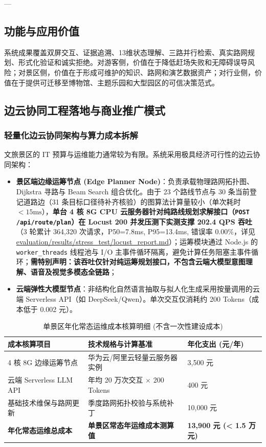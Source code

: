\documentclass[11pt,a4paper]{ctexart}
\begin{document}
---

\subsection{功能与应用价值}
系统成果覆盖双屏交互、证据追溯、13维状态理解、三路并行检索、真实路网规划、形式化验证和诚实拒绝。对游客侧，价值在于降低赶场失败和无障碍误导风险；对景区侧，价值在于形成可维护的知识、路网和演艺数据资产；对行业侧，价值在于提供可迁移至博物馆、主题乐园和大型园区的可信决策范式。

\subsection{边云协同工程落地与商业推广模式}

\subsubsection{轻量化边云协同架构与算力成本拆解}
文旅景区的 IT 预算与运维能力通常较为有限。系统采用极具经济可行性的边云协同架构：
\begin{itemize}
    \item \textbf{景区端边缘运筹节点 (Edge Planner Node)}：负责承载物理路网拓扑图、Dijkstra 寻路与 Beam Search 组合优化。由于 23 个路线节点与 30 条当前登记道路边（31 条目标口径待补齐核验）的图算法计算量较小（单次耗时 $<15\text{ms}$），\textbf{单台 4 核 8G CPU 云服务器针对纯路线规划求解接口（\texttt{POST /api/route/plan}）在 Locust 200 并发压测下实测支撑 202.4 QPS 吞吐}（3 轮累计 364,320 次请求，P50=7.8ms, P95=13.4ms, 错误率 0.00\%，详见 \url{evaluation/results/stress_test/locust_report.md}）；运筹模块通过 Node.js 的 \texttt{worker\_threads} 线程池与 I/O 主事件循环隔离，避免计算任务阻塞主事件循环；\textbf{需特别声明：该吞吐仅针对纯运筹规划接口，不包含云端大模型意图理解、语音及视觉多模态全链路}；
    \item \textbf{云端弹性大模型节点}：非结构化自然语言抽取与拟人化生成采用按量调用的云端 Serverless API（如 DeepSeek/Qwen）。单次交互仅消耗约 200 Tokens（成本低于 0.002 元）。
\end{itemize}

\begin{table}[htbp]
\centering
\small
\caption{单景区年化常态运维成本核算明细 (不含一次性建设成本)}
\label{tab:cost}
\begin{tabularx}{\textwidth}{p{4.5cm}Xp{3.5cm}}
\toprule
\textbf{成本核算项目} & \textbf{技术规格与计算基准} & \textbf{年化支出 (元/年)} \\
\midrule
4 核 8G 边缘运筹节点 & 华为云/阿里云轻量云服务器实例 & 3,500 元 \\
云端 Serverless LLM API & 年均 20 万次交互 $\times$ 200 Tokens & 400 元 \\
基础技术维保与路网更新 & 季度路网拓扑校验与系统补丁 & 10,000 元 \\
\midrule
\textbf{年化常态运维总成本} & \textbf{单景区常态年运维成本测算值} & \textbf{13,900 元 (< 1.5 万元)} \\
\bottomrule
\end{tabularx}
\end{table}
\end{document}
